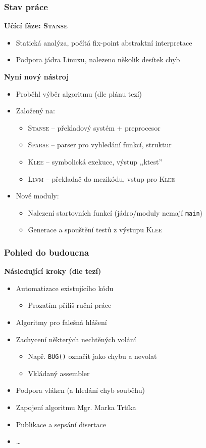 \documentclass[xcolor=dvipsnames]{beamer}
\newcommand{\heading}[1]{\textbf{\textcolor{BurntOrange}{#1}}}
\begin{document}
\begin{frame}
  \frametitle{Stav práce}
  \heading{Učící fáze: \textsc{Stanse}}
  \begin{itemize}
  \item Statická analýza, počítá fix-point abstraktní interpretace
  \item Podpora jádra Linuxu, nalezeno několik desítek chyb
  \end{itemize}

  \pause
  \medskip

  \heading{Nyní nový nástroj}
  \begin{itemize}
  \item Proběhl výběr algoritmu (dle plánu tezí)
  \item Založený na:
  \begin{itemize}
  \item \textsc{Stanse} -- překladový systém + preprocesor
  \item \textsc{Sparse} -- parser pro vyhledání funkcí, struktur
  \item \textsc{Klee} -- symbolická exekuce, výstup ,,ktest''
  \item \textsc{Llvm} -- překladač do mezikódu, vstup pro \textsc{Klee}
  \end{itemize}\pause
  \item Nové moduly:
  \begin{itemize}
  \item Nalezení startovních funkcí (jádro/moduly nemají \texttt{main})
  \item Generace a spouštění testů z výstupu \textsc{Klee}
  \end{itemize}
  \end{itemize}

\end{frame}

\begin{frame}
  \frametitle{Pohled do budoucna}
  \heading{Následující kroky (dle tezí)}
  \begin{itemize}
  \item Automatizace existujícího kódu
  \begin{itemize}
  \item Prozatím příliš ruční práce
  \end{itemize}
  \item Algoritmy pro falešná hlášení
  \item Zachycení některých nechtěných volání
  \begin{itemize}
  \item Např. \texttt{BUG()} označit jako chybu a nevolat
  \item Vkládaný assembler
  \end{itemize}
  \item Podpora vláken (a hledání chyb souběhu)
  \item Zapojení algoritmu Mgr. Marka Trtíka
  \item Publikace a sepsání disertace
  \item \ldots
  \end{itemize}

\end{frame}
\end{document}
